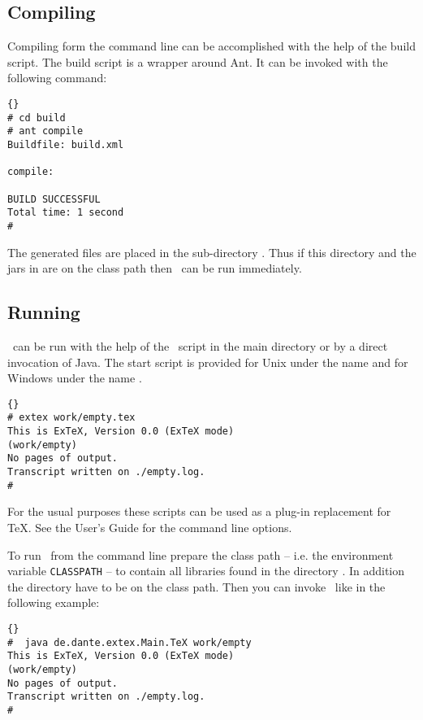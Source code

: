 \subsection{Compiling \ExTeX}\label{sec:shell-compile}

Compiling \ExTeX form the command line can be accomplished with the
help of the build script. The build script is a wrapper around Ant. It
can be invoked with the following command:

\begin{lstlisting}{}
# cd build
# ant compile
Buildfile: build.xml

compile:

BUILD SUCCESSFUL
Total time: 1 second
#
\end{lstlisting}

The generated files are placed in the sub-directory
. Thus if this directory and the jars in
 are on the class path then \ExTeX\ can be run immediately.


\subsection{Running \ExTeX}

\ExTeX\ can be run with the help of the \ExTeX\ script in the main
directory or by a direct invocation of Java. The start script is
provided for Unix under the name  and for Windows under
the name .
\begin{lstlisting}{}
# extex work/empty.tex
This is ExTeX, Version 0.0 (ExTeX mode)
(work/empty)
No pages of output.
Transcript written on ./empty.log.
#
\end{lstlisting}{}

For the usual purposes these scripts can be used as a plug-in
replacement for \TeX. See the User's Guide for the command line
options.

To run \ExTeX\ from the command line prepare the class path -- i.e.
the environment variable \texttt{CLASSPATH} -- to contain all
libraries found in the directory . In addition the
directory  have to be on the class path.
Then you can invoke \ExTeX\ like in the following example:

\begin{lstlisting}{}
#  java de.dante.extex.Main.TeX work/empty
This is ExTeX, Version 0.0 (ExTeX mode)
(work/empty)
No pages of output.
Transcript written on ./empty.log.
#
\end{lstlisting}{}

